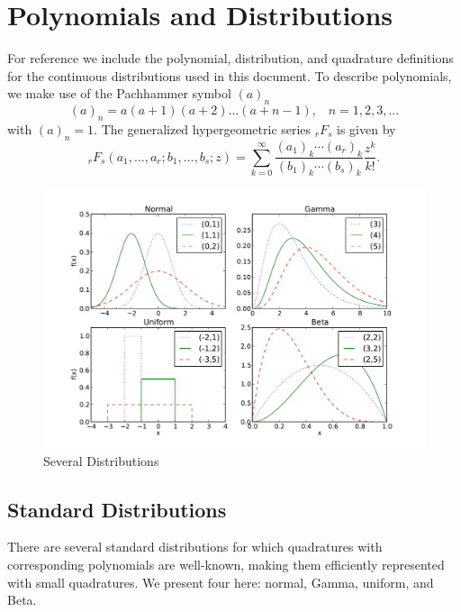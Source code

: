 \section{Polynomials and Distributions}
For reference we include the polynomial, distribution, and quadrature definitions for the continuous distributions used in this document.  To describe polynomials, we make use of the Pachhammer symbol $(a)_n$
\begin{equation}
(a)_n=a(a+1)(a+2)...(a+n-1),\hspace{10pt}n=1,2,3,...
\end{equation}
with $(a)_n=1$.  The generalized hypergeometric series $_rF_s$ is given by
\begin{equation}
_rF_s(a_1,...,a_r;b_1,...,b_s;z)=\sum_{k=0}^\infty \frac{(a_1)_k\cdots(a_r)_k}{(b_1)_k\cdots(b_s)_k}\frac{z^k}{k!}.
\end{equation}
\begin{figure}[h!]
\centering
\includegraphics[width=\linewidth]{./graphics/distros}
\caption{Several Distributions}
\label{fig:distros}
\end{figure}

\subsection{Standard Distributions}
There are several standard distributions for which quadratures with corresponding polynomials are well-known, making them efficiently represented with small quadratures.  We present four here: normal, Gamma, uniform, and Beta.

\newpage
